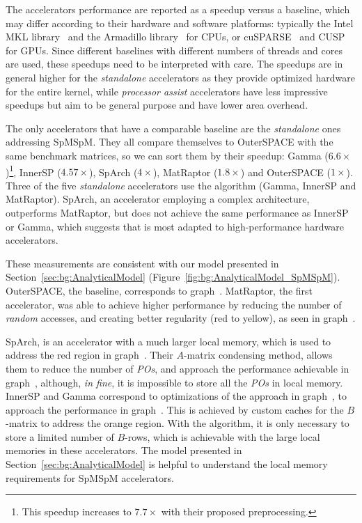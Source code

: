 The accelerators performance are reported as a speedup versus a baseline, which may differ according to their hardware and software platforms: typically the Intel MKL library~\cite{Intel2003_IntelMKL} and the Armadillo library~\cite{Conrad2016_Armadillo} for CPUs, or cuSPARSE~\cite{NVIDIA2014_cuSPARSE} and CUSP~\cite{Dalton2014_Cusp} for GPUs.
Since different baselines with different numbers of threads and cores are used, these speedups need to be interpreted with care.
The speedups are in general higher for the \emph{standalone} accelerators as they provide optimized hardware for the entire kernel, while \emph{processor assist} accelerators have less impressive speedups but aim to be general purpose and have lower area overhead.

The only accelerators that have a comparable baseline are the \emph{standalone} ones addressing SpMSpM. They all compare themselves to OuterSPACE with the same benchmark matrices, so we can sort them by their speedup: Gamma ($6.6\times$)\footnote{This speedup increases to $7.7\times$ with their proposed preprocessing.}, InnerSP ($4.57\times$), SpArch ($4\times$), MatRaptor ($1.8\times$) and OuterSPACE ($1\times$).
Three of the five \emph{standalone} accelerators use the  algorithm (Gamma, InnerSP and MatRaptor). SpArch, an  accelerator employing a complex architecture, outperforms MatRaptor, but does not achieve the same performance as InnerSP or Gamma, which suggests that  is most adapted to high-performance hardware accelerators.

These measurements are consistent with our model presented in Section~\ref{sec:bg:AnalyticalModel} (Figure~\ref{fig:bg:AnalyticalModel_SpMSpM}). OuterSPACE, the baseline, corresponds to graph~. MatRaptor, the first  accelerator, was able to achieve higher performance by reducing the number of \emph{random} accesses, and creating better regularity (red to yellow), as seen in graph~.

SpArch, is an  accelerator with a much larger local memory, which is used to address the red region in graph~. Their $A$-matrix condensing method, allows them to reduce the number of \emph{POs}, and approach the performance achievable in graph~, although, \emph{in fine}, it is impossible to store all the \emph{POs} in local memory. InnerSP and Gamma correspond to optimizations of the  approach in graph~, to approach the performance in graph~. This is achieved by custom caches for the $B$-matrix to address the orange region. With the  algorithm, it is only necessary to store a limited number of $B$-rows, which is achievable with the large local memories in these accelerators. The model presented in Section~\ref{sec:bg:AnalyticalModel} is helpful to understand the local memory requirements for SpMSpM accelerators.

